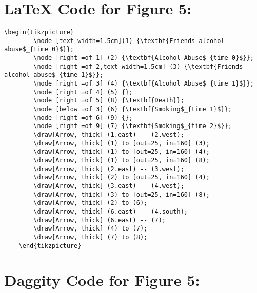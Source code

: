 \documentclass{article}
\begin{document}
\section*{\LaTeX\hspace*{1mm} Code for Figure 5:}
\begin{lstlisting}[frame=single, basicstyle=\ttfamily]
    \begin{tikzpicture}
        \node [text width=1.5cm](1) {\textbf{Friends alcohol abuse$_{time 0}$}};
        \node [right =of 1] (2) {\textbf{Alcohol Abuse$_{time 0}$}};
        \node [right =of 2,text width=1.5cm] (3) {\textbf{Friends alcohol abuse$_{time 1}$}};
        \node [right =of 3] (4) {\textbf{Alcohol Abuse$_{time 1}$}};
        \node [right =of 4] (5) {};
        \node [right =of 5] (8) {\textbf{Death}};
        \node [below =of 3] (6) {\textbf{Smoking$_{time 1}$}};
        \node [right =of 6] (9) {};
        \node [right =of 9] (7) {\textbf{Smoking$_{time 2}$}};
        \draw[Arrow, thick] (1.east) -- (2.west);
        \draw[Arrow, thick] (1) to [out=25, in=160] (3);
        \draw[Arrow, thick] (1) to [out=25, in=160] (4);
        \draw[Arrow, thick] (1) to [out=25, in=160] (8);
        \draw[Arrow, thick] (2.east) -- (3.west);
        \draw[Arrow, thick] (2) to [out=25, in=160] (4);
        \draw[Arrow, thick] (3.east) -- (4.west);
        \draw[Arrow, thick] (3) to [out=25, in=160] (8);
        \draw[Arrow, thick] (2) to (6);
        \draw[Arrow, thick] (6.east) -- (4.south);
        \draw[Arrow, thick] (6.east) -- (7);
        \draw[Arrow, thick] (4) to (7);
        \draw[Arrow, thick] (7) to (8);
    \end{tikzpicture}
\end{lstlisting}


\section*{Daggity Code for Figure 5:}
\begin{lstlisting}[frame=single, basicstyle=\ttfamily]

\end{lstlisting}
\end{document}

